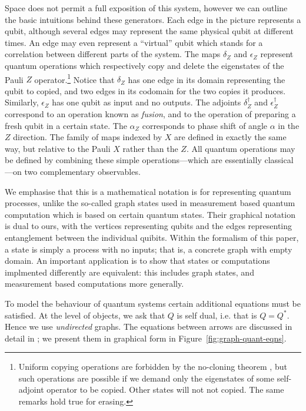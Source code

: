 \documentclass[runningheads]{llncs}
\begin{document}
Space does not permit a full exposition of this system, however we
can outline the basic intuitions behind these generators.  Each edge
in the picture represents a qubit, although several edges may
represent the same physical qubit at different times.  An edge may
even represent a ``virtual'' qubit which stands for a correlation
between different parts of the  system.  The maps
$\delta_Z$ and $\epsilon_Z$ represent quantum operations which
respectively copy and delete the eigenstates
of the  Pauli $Z$ operator.\footnote{Uniform copying operations are
  forbidden by the no-cloning theorem \cite{no-cloning}, but such
  operations are possible if we demand only the eigenstates of some
  self-adjoint operator to be copied. Other states will not not
  copied.  The same remarks hold true for erasing.}  
Notice that $\delta_Z$ has one edge
in its domain representing the qubit to copied, and two edges in its
codomain for the two copies it produces.  Similarly, $\epsilon_Z$ has
one qubit as input and no outputs.
The adjoints $\delta^\dag_Z$ and  $\epsilon^\dag_Z$ correspond to an
operation known as \emph{fusion}, and to the operation of preparing a
fresh qubit in a certain state. The $\alpha_Z$ corresponds to phase
shift of angle $\alpha$ in the $Z$ direction.  The family of maps
indexed by $X$ are defined in exactly the same way, but relative to
the Pauli $X$ rather than the $Z$.  All quantum operations may be
defined by combining these simple operations---which are essentially
classical---on two complementary observables. 

\begin{remark}
  We emphasise that this is a mathematical notation is for
  representing quantum processes, unlike the so-called graph states
  used in measurement based quantum computation \cite{Briegel etc}
  which is based on certain quantum states.  Their graphical notation
  is dual to ours, with the vertices representing qubits and the edges
  representing entanglement between the individual quibits.  Within
  the formalism of this paper, a state is simply a process with no
  inputs; that  is, a concrete graph with empty domain.  An important
  application is to show that states or computations implmented
  differently are equivalent:  this includes graph states, and
  measurement based computations more generally. 
\end{remark} 

To model the behaviour of quantum systems certain additional equations
must be satisfied.  At the  level of objects, we ask that  $Q$ is
self dual, i.e. that is $Q = Q^*$.  Hence we use \emph{undirected}
graphs.  The equations between arrows are discussed in detail in
\cite{Coecke:2008jo};  we present them in graphical form in
Figure~\ref{fig:graph-quant-eqns}.
\end{document}
